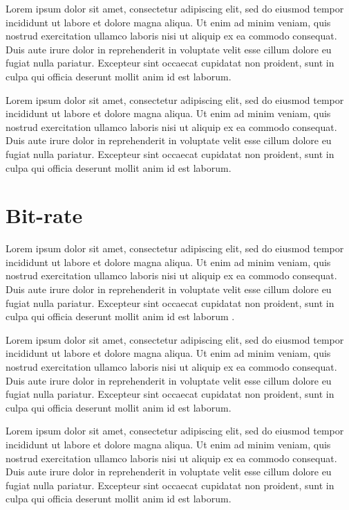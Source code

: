 Lorem ipsum dolor sit amet, consectetur adipiscing elit, sed do eiusmod tempor incididunt ut labore et dolore magna aliqua. Ut enim ad minim veniam, quis nostrud exercitation ullamco laboris nisi ut aliquip ex ea commodo consequat. Duis aute irure dolor in reprehenderit in voluptate velit esse cillum dolore eu fugiat nulla pariatur. Excepteur sint occaecat cupidatat non proident, sunt in culpa qui officia deserunt mollit anim id est laborum.

Lorem ipsum dolor sit amet, consectetur adipiscing elit, sed do eiusmod tempor incididunt ut labore et dolore magna aliqua. Ut enim ad minim veniam, quis nostrud exercitation ullamco laboris nisi ut aliquip ex ea commodo consequat. Duis aute irure dolor in reprehenderit in voluptate velit esse cillum dolore eu fugiat nulla pariatur. Excepteur sint occaecat cupidatat non proident, sunt in culpa qui officia deserunt mollit anim id est laborum.




\section{Bit-rate}
Lorem ipsum dolor sit amet, consectetur adipiscing elit, sed do eiusmod tempor incididunt ut labore et dolore magna aliqua. Ut enim ad minim veniam, quis nostrud exercitation ullamco laboris nisi ut aliquip ex ea commodo consequat. Duis aute irure dolor in reprehenderit in voluptate velit esse cillum dolore eu fugiat nulla pariatur. Excepteur sint occaecat cupidatat non proident, sunt in culpa qui officia deserunt mollit anim id est laborum \parencite{Network_Analysis_of_the_Sony_Remote_Play_System}.

Lorem ipsum dolor sit amet, consectetur adipiscing elit, sed do eiusmod tempor incididunt ut labore et dolore magna aliqua. Ut enim ad minim veniam, quis nostrud exercitation ullamco laboris nisi ut aliquip ex ea commodo consequat. Duis aute irure dolor in reprehenderit in voluptate velit esse cillum dolore eu fugiat nulla pariatur. Excepteur sint occaecat cupidatat non proident, sunt in culpa qui officia deserunt mollit anim id est laborum.

Lorem ipsum dolor sit amet, consectetur adipiscing elit, sed do eiusmod tempor incididunt ut labore et dolore magna aliqua. Ut enim ad minim veniam, quis nostrud exercitation ullamco laboris nisi ut aliquip ex ea commodo consequat. Duis aute irure dolor in reprehenderit in voluptate velit esse cillum dolore eu fugiat nulla pariatur. Excepteur sint occaecat cupidatat non proident, sunt in culpa qui officia deserunt mollit anim id est laborum.

